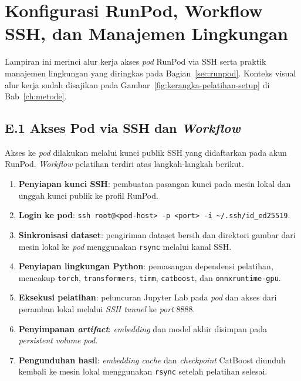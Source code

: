 \chapter{Konfigurasi RunPod, Workflow SSH, dan Manajemen Lingkungan}
\label{app:runpod-workflow}

Lampiran ini merinci alur kerja akses \textit{pod} RunPod via SSH serta praktik manajemen lingkungan yang diringkas pada Bagian~\ref{sec:runpod}. Konteks visual alur kerja sudah disajikan pada Gambar~\ref{fig:kerangka-pelatihan-setup} di Bab~\ref{ch:metode}.

\section*{E.1 Akses Pod via SSH dan \textit{Workflow}}

Akses ke \textit{pod} dilakukan melalui kunci publik SSH yang didaftarkan pada akun RunPod. \textit{Workflow} pelatihan terdiri atas langkah-langkah berikut.

\begin{enumerate}
    \item \textbf{Penyiapan kunci SSH}: pembuatan pasangan kunci pada mesin lokal dan unggah kunci publik ke profil RunPod.
    \item \textbf{Login ke pod}: \texttt{ssh root@<pod-host>\allowbreak{} -p <port>\allowbreak{} -i \textasciitilde/.ssh/\allowbreak{}id\_ed25519}.
    \item \textbf{Sinkronisasi dataset}: pengiriman dataset bersih dan direktori gambar dari mesin lokal ke \textit{pod} menggunakan \texttt{rsync} melalui kanal SSH.
    \item \textbf{Penyiapan lingkungan Python}: pemasangan dependensi pelatihan, mencakup \texttt{torch}, \texttt{transformers}, \texttt{timm}, \texttt{catboost}, dan \texttt{onnxruntime-gpu}.
    \item \textbf{Eksekusi pelatihan}: peluncuran Jupyter Lab pada \textit{pod} dan akses dari peramban lokal melalui \textit{SSH tunnel} ke \textit{port} 8888.
    \item \textbf{Penyimpanan \textit{artifact}}: \textit{embedding} dan model akhir disimpan pada \textit{persistent volume} \textit{pod}.
    \item \textbf{Pengunduhan hasil}: \textit{embedding cache} dan \textit{checkpoint} CatBoost diunduh kembali ke mesin lokal menggunakan \texttt{rsync} setelah pelatihan selesai.
\end{enumerate}

